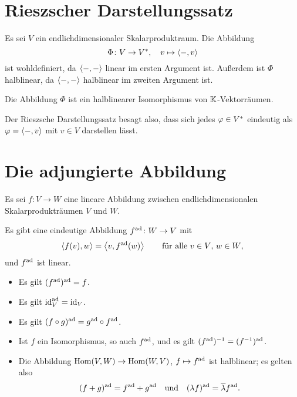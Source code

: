 \section{Rieszscher Darstellungssatz}

Es sei $V$ ein endlichdimensionaler Skalarproduktraum.
Die Abbildung
\[
          \Phi
  \colon  V
  \to     V^*,
  \quad   v
  \mapsto \left\langle -, v \right\rangle
\]
ist wohldefiniert, da $\left\langle -, - \right\rangle$ linear im ersten Argument ist.
Außerdem ist $\Phi$ halblinear, da $\left\langle -, - \right\rangle$ halblinear im zweiten Argument ist.

\begin{theorem}
  \label{theorem: Riesz representation theorem}
  Die Abbildung $\Phi$ ist ein halblinearer Isomorphismus von $\mathbb{K}$-Vektorräumen.
\end{theorem}

Der Rieszsche Darstellungssatz besagt also, dass sich jedes $\varphi \in V^*$ eindeutig als $\varphi = \left\langle -, v \right\rangle$ mit $v \in V$ darstellen lässt.





\section{Die adjungierte Abbildung}
\label{section: adjoint map for scalar products}

Es sei $f \colon V \to W$ eine lineare Abbildung zwischen endlichdimensionalen Skalarprodukträumen $V$ und $W$.

\begin{proposition}
  Es gibt eine eindeutige Abbildung $f^{\operatorname{ad}} \colon W \to V$ mit
  \begin{equation}
    \label{equation: definition of the adjoint map by elements for scalar products}
      \left\langle f(v), w \right\rangle
    = \left\langle v, f^{\operatorname{ad}}(w) \right\rangle
    \qquad
    \text{für alle $v \in V$, $w \in W$},
  \end{equation}
  und $f^{\operatorname{ad}}$ ist linear.
\end{proposition}

\begin{lemma}
  \leavevmode
  \begin{itemize}
    \item
      Es gilt $(f^{\operatorname{ad}})^{\operatorname{ad}} = f$.
    \item
      Es gilt $\operatorname{id}_V^{\operatorname{ad}} = \operatorname{id}_V$.
    \item
      Es gilt $(f \circ g)^{\operatorname{ad}} = g^{\operatorname{ad}} \circ f^{\operatorname{ad}}$.
    \item
      Ist $f$ ein Isomorphismus, so auch $f^{\operatorname{ad}}$, und es gilt $(f^{\operatorname{ad}})^{-1} = (f^{-1})^{\operatorname{ad}}$.
    \item
      Die Abbildung $\operatorname{Hom}(V, W) \to \operatorname{Hom}(W, V)$, $f \mapsto f^{\operatorname{ad}}$ ist halblinear;
      es gelten also
      \[
          (f + g)^{\operatorname{ad}}
        = f^{\operatorname{ad}} + g^{\operatorname{ad}}
        \quad\text{und}\quad
          (\lambda f)^{\operatorname{ad}}
        = \overline{\lambda} f^{\operatorname{ad}}.
      \]
  \end{itemize}
\end{lemma}

